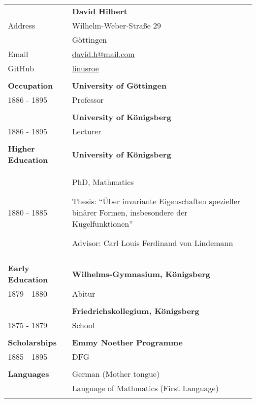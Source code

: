 \documentclass[12pt, a4paper]{article}
\newcommand{\putname}{David Hilbert}
\begin{document}
\begin{longtable}{@{} p{} >{\RaggedRight}p{}}
  \\
  & \textbf{\putname} \\
  Address
  & Wilhelm-Weber-Straße 29\\
  & 37075 G\"ottingen \\
  Email
  & \href{mailto:}{david.h@mail.com} \\
  GitHub
  & \href{https://github.com/linusroe}{linusroe} \\
  \\


  \textcolor{midblue}{\textbf{Occupation}}
  & \textbf{University of Göttingen} \\
  1886 - 1895
  & Professor \\
  & \\

  & \textbf{University of Königsberg} \\
  1886 - 1895
  & Lecturer \\
  & \\


  \textcolor{midblue}{\textbf{Higher Education}}
  & \textbf{University of Königsberg} \\
  1880 - 1885
  & PhD, Mathmatics  

  Thesis: ``Über invariante Eigenschaften spezieller
  binärer Formen, insbesondere der Kugelfunktionen''

  Advisor: Carl Louis Ferdinand von Lindemann \\
  & \\


  \textcolor{midblue}{\textbf{Early Education}}
  & \textbf{Wilhelms-Gymnasium, Königsberg} \\
  1879 - 1880
  & Abitur \\
  & \\

  & \textbf{Friedrichskollegium, Königsberg} \\
  1875 - 1879 
  & School \\
  & \\


  \textcolor{midblue}{\textbf{Scholarships}}
  & \textbf{Emmy Noether Programme} \\
  1885 - 1895
  & DFG \\
  & \\


  \textcolor{midblue}{\textbf{Languages}}
  & German (Mother tongue) \\
  & Language of Mathmatics (First Language) \\
  & \\



\end{longtable}
\end{document}
